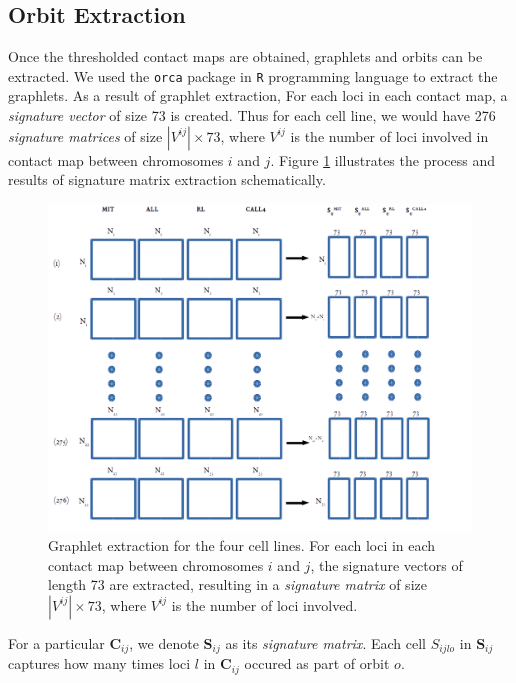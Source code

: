 \documentclass[a4,center,fleqn]{NAR}
\begin{document}
\subsection{Orbit Extraction}
Once the thresholded contact maps are obtained, graphlets and orbits can be 
extracted. We used the \texttt{orca} package in \texttt{R} programming 
language to extract the graphlets. As a result of graphlet extraction, 
For each loci in each contact map, a \textit{signature vector} of size
73 is created. Thus for each cell line, we would have 276 
\textit{signature matrices} of
size $|V^{ij}|\times 73$, where $V^{ij}$ is the number of loci
involved in contact map between chromosomes $i$ and $j$. Figure
\ref{fig:graphlet_extraction} illustrates the process and results
of signature matrix extraction schematically.
\begin{figure}
    \centering
    \includegraphics[width=.5\textwidth]{figures/graphlet_extraction.png}
    \caption{Graphlet extraction for the four cell lines. For each
    loci in each contact map between chromosomes $i$ and $j$, 
    the signature vectors of length 73 are extracted, resulting 
    in a \textit{signature matrix} of size $|V^{ij}| \times 73$,
    where $V^{ij}$ 
    is the number of loci involved.}
    \label{fig:graphlet_extraction}
\end{figure}

For a particular
$\mathbf{C}_{ij}$, we denote $\mathbf{S}_{ij}$ as its \textit{signature 
matrix}. Each cell $S_{ijlo}$ in $\mathbf{S}_{ij}$ captures how many
times loci $l$ in $\mathbf{C}_{ij}$ occured as part of orbit $o$.
\end{document}

